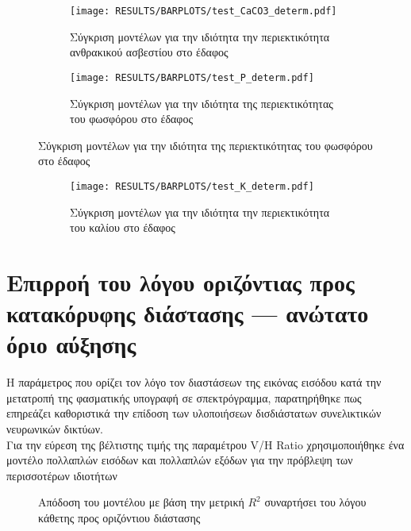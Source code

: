 \begin{figure}[H]
    \begin{subfigure}{0.5\textwidth}
        \texttt{[image: RESULTS/BARPLOTS/test\_CaCO3\_determ.pdf]}
        \caption{Σύγκριση μοντέλων για την ιδιότητα την περιεκτικότητα ανθρακικού ασβεστίου στο έδαφος}
        \label{fig:subim7}
    \end{subfigure}
    \begin{subfigure}{0.5\textwidth}
        \texttt{[image: RESULTS/BARPLOTS/test\_P\_determ.pdf]}
        \caption{Σύγκριση μοντέλων για την ιδιότητα της περιεκτικότητας του φωσφόρου στο έδαφος}
        \label{fig:subim8}
    \end{subfigure}
\end{figure}
\begin{figure}[H]
    \begin{subfigure}{0.5\textwidth}
        \texttt{[image: RESULTS/BARPLOTS/test\_K\_determ.pdf]}
        \caption{Σύγκριση μοντέλων για την ιδιότητα την περιεκτικότητα του καλίου στο έδαφος}
        \label{fig:subim9}
    \end{subfigure}
    \begin{subfigure}{0.5\textwidth}
        
    \end{subfigure}
\end{figure}

\section{Επιρροή του λόγου οριζόντιας προς κατακόρυφης διάστασης --- ανώτατο όριο αύξησης}
Η παράμετρος που ορίζει τον λόγο τον διαστάσεων της εικόνας εισόδου κατά την μετατροπή της φασματικής υπογραφή σε σπεκτρόγραμμα, παρατηρήθηκε πως επηρεάζει καθοριστικά την επίδοση των υλοποιήσεων δισδιάστατων συνελικτικών νευρωνικών δικτύων.\\
Για την εύρεση της βέλτιστης τιμής της παραμέτρου V/H Ratio χρησιμοποιήθηκε ένα μοντέλο πολλαπλών εισόδων και πολλαπλών εξόδων για την πρόβλεψη των περισσοτέρων ιδιοτήτων

\begin{figure}[H]
  \begin{center}
    
    \caption{Απόδοση του μοντέλου με βάση την μετρική $R^2$ συναρτήσει του λόγου κάθετης προς οριζόντιου διάστασης}
  \end{center}
\end{figure}

